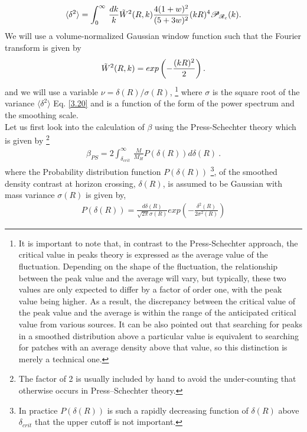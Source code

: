 \begin{align}
     \langle \delta^2 \rangle =  \int_{0}^{\infty} \,\frac{dk}{k}  \Tilde{W}^{2}(R,k) \frac{4(1+w)^2}{(5+3w)^2} (kR)^4\mathcal{P}_{\mathcal{R}_{c}}(k). \label{3.23}
\end{align}
We will use a volume-normalized Gaussian window function such that the Fourier transform is given by
\begin{align}
    \Tilde{W}^{2}(R,k) = exp \left(-\frac{(kR)^{2}}{2}\right).\label{3.24}
\end{align}
and we will use a variable $\nu = \delta(R)/ \sigma(R) $, \footnote{It is important to note that, in contrast to the Press-Schechter approach, the critical value in peaks theory is expressed as the average value of the fluctuation. Depending on the shape of the fluctuation, the relationship between the peak value and the average will vary, but typically, these two values are only expected to differ by a factor of order one, with the peak value being higher. As a result, the discrepancy between the critical value of the peak value and the average is within the range of the anticipated critical value from various sources. It can be also pointed out that searching for peaks in a smoothed distribution above a particular value is equivalent to searching for patches with an average density above that value, so this distinction is merely a technical one.}
where $\sigma$ is the square root of the variance $\langle \delta^2 \rangle $ Eq. \ref{3.20} and is a function of the form of the power spectrum and the smoothing scale.\\
Let us first look into the calculation of $\beta$ using the Press-Schechter theory which is given by \footnote{The factor of 2 is usually included by hand to avoid the under-counting that otherwise occurs in Press–Schechter theory.}
\begin{align}
    \beta_{PS}  = 2 \int_{\delta_{crit}}^{\infty} \, \frac{M}{M_H} P(\delta(R)) d\delta(R) \ . \label{3.25}
\end{align}
where the Probability distribution function $P(\delta(R))$ \footnote{In practice $P(\delta(R))$ is such a rapidly decreasing function of $\delta(R)$ above $\delta_{crit}$ that the upper cutoff is not important.}, of the smoothed density contrast at horizon
crossing, $\delta(R)$, is assumed to be Gaussian with mass variance $\sigma(R)$ is given by,
\begin{align}
    P(\delta(R)) = \frac{d\delta(R)}{\sqrt{2\pi} \sigma(R)} exp\left( -\frac{\delta^{2}(R)}{2\sigma^{2}(R)} \right) \label{3.26}
\end{align}

